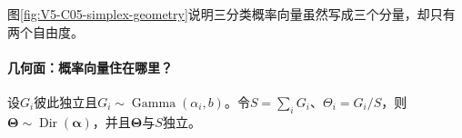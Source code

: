 \documentclass[UTF8,a4paper,11pt,openany]{ctexbook}
\begin{document}
\setcounter{page}{830}
\setcounter{chapter}{34}
\setcounter{figure}{3}
\setcounter{equation}{3}
\pagestyle{headings}
图\ref{fig:V5-C05-simplex-geometry}说明三分类概率向量虽然写成三个分量，却只有两个自由度。

\paragraph{几何面：概率向量住在哪里？}

\FloatBarrier

\begin{theorem}[Gamma归一化构造]
设$G_i$彼此独立且$G_i\sim\operatorname{Gamma}(\alpha_i,b)$。令$S=\sum_iG_i$、$\Theta_i=G_i/S$，则$\boldsymbol\Theta\sim\operatorname{Dir}(\boldsymbol\alpha)$，并且$\boldsymbol\Theta$与$S$独立。
\end{theorem}
\end{document}
